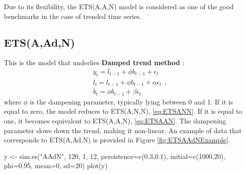 \documentclass[
]{book}
\newenvironment{Shaded}{\begin{snugshade}}{\end{snugshade}}
\newcommand{\AttributeTok}[1]{\textcolor[rgb]{0.77,0.63,0.00}{#1}}
\newcommand{\DecValTok}[1]{\textcolor[rgb]{0.00,0.00,0.81}{#1}}
\newcommand{\FloatTok}[1]{\textcolor[rgb]{0.00,0.00,0.81}{#1}}
\newcommand{\FunctionTok}[1]{\textcolor[rgb]{0.00,0.00,0.00}{#1}}
\newcommand{\NormalTok}[1]{#1}
\newcommand{\OtherTok}[1]{\textcolor[rgb]{0.56,0.35,0.01}{#1}}
\newcommand{\StringTok}[1]{\textcolor[rgb]{0.31,0.60,0.02}{#1}}
\theoremstyle{definition}
\theoremstyle{definition}
\theoremstyle{definition}
\theoremstyle{definition}
\theoremstyle{remark}
\begin{document}
Due to its flexibility, the ETS(A,A,N) model is considered as one of the good benchmarks in the case of trended time series.

\hypertarget{ETSAAdN}{%
\subsection{ETS(A,Ad,N)}\label{ETSAAdN}}

This is the model that underlies \textbf{Damped trend method} \citep{Roberts1982, Gardner1985a}:
\begin{equation}
  \begin{aligned}
    & y_{t} = l_{t-1} + \phi b_{t-1} + \epsilon_t \\
    & l_t = l_{t-1} + \phi b_{t-1} + \alpha \epsilon_t \\
    & b_t = \phi b_{t-1} + \beta \epsilon_t
  \end{aligned} ,
  \label{eq:ETSAAdN}
\end{equation}
where \(\phi\) is the dampening parameter, typically lying between 0 and 1. If it is equal to zero, the model reduces to ETS(A,N,N), \eqref{eq:ETSANN}. If it is equal to one, it becomes equivalent to ETS(A,A,N), \eqref{eq:ETSAAN}. The dampening parameter slows down the trend, making it non-linear. An example of data that corresponds to ETS(A,Ad,N) is provided in Figure \ref{fig:ETSAAdNExample}.

\begin{Shaded}
\begin{Highlighting}[]
\NormalTok{y }\OtherTok{\textless{}{-}} \FunctionTok{sim.es}\NormalTok{(}\StringTok{"AAdN"}\NormalTok{, }\DecValTok{120}\NormalTok{, }\DecValTok{1}\NormalTok{, }\DecValTok{12}\NormalTok{, }\AttributeTok{persistence=}\FunctionTok{c}\NormalTok{(}\FloatTok{0.3}\NormalTok{,}\FloatTok{0.1}\NormalTok{),}
            \AttributeTok{initial=}\FunctionTok{c}\NormalTok{(}\DecValTok{1000}\NormalTok{,}\DecValTok{20}\NormalTok{), }\AttributeTok{phi=}\FloatTok{0.95}\NormalTok{, }\AttributeTok{mean=}\DecValTok{0}\NormalTok{, }\AttributeTok{sd=}\DecValTok{20}\NormalTok{)}
\FunctionTok{plot}\NormalTok{(y)}
\end{Highlighting}
\end{Shaded}
\end{document}
